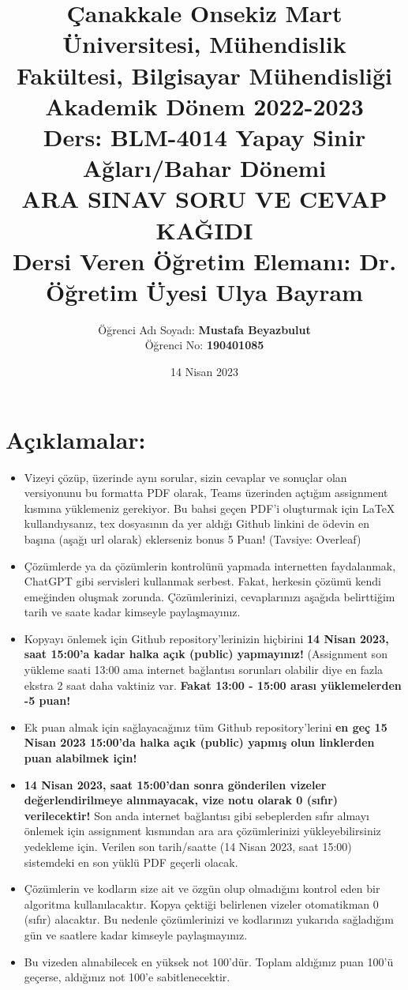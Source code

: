 \documentclass[11pt]{article}
\title{Çanakkale Onsekiz Mart Üniversitesi, Mühendislik Fakültesi, Bilgisayar Mühendisliği Akademik Dönem 2022-2023\\
Ders: BLM-4014 Yapay Sinir Ağları/Bahar Dönemi\\ 
ARA SINAV SORU VE CEVAP KAĞIDI\\
Dersi Veren Öğretim Elemanı: Dr. Öğretim Üyesi Ulya Bayram}
\author{%
\begin{minipage}{\textwidth}
\raggedright
Öğrenci Adı Soyadı:  \textbf{Mustafa Beyazbulut}\\ %
Öğrenci No:  \textbf{190401085}
\end{minipage}%
}
\date{14 Nisan 2023}
\begin{document}
\maketitle

\vspace{-.5in}
\section*{Açıklamalar:}
\begin{itemize}
    \item Vizeyi çözüp, üzerinde aynı sorular, sizin cevaplar ve sonuçlar olan versiyonunu bu formatta PDF olarak, Teams üzerinden açtığım assignment kısmına yüklemeniz gerekiyor. Bu bahsi geçen PDF'i oluşturmak için LaTeX kullandıysanız, tex dosyasının da yer aldığı Github linkini de ödevin en başına (aşağı url olarak) eklerseniz bonus 5 Puan! (Tavsiye: Overleaf)
    \item Çözümlerde ya da çözümlerin kontrolünü yapmada internetten faydalanmak, ChatGPT gibi servisleri kullanmak serbest. Fakat, herkesin çözümü kendi emeğinden oluşmak zorunda. Çözümlerinizi, cevaplarınızı aşağıda belirttiğim tarih ve saate kadar kimseyle paylaşmayınız. 
    \item Kopyayı önlemek için Github repository'lerinizin hiçbirini \textbf{14 Nisan 2023, saat 15:00'a kadar halka açık (public) yapmayınız!} (Assignment son yükleme saati 13:00 ama internet bağlantısı sorunları olabilir diye en fazla ekstra 2 saat daha vaktiniz var. \textbf{Fakat 13:00 - 15:00 arası yüklemelerden -5 puan!}
    \item Ek puan almak için sağlayacağınız tüm Github repository'lerini \textbf{en geç 15 Nisan 2023 15:00'da halka açık (public) yapmış olun linklerden puan alabilmek için!}
    \item \textbf{14 Nisan 2023, saat 15:00'dan sonra gönderilen vizeler değerlendirilmeye alınmayacak, vize notu olarak 0 (sıfır) verilecektir!} Son anda internet bağlantısı gibi sebeplerden sıfır almayı önlemek için assignment kısmından ara ara çözümlerinizi yükleyebilirsiniz yedekleme için. Verilen son tarih/saatte (14 Nisan 2023, saat 15:00) sistemdeki en son yüklü PDF geçerli olacak.
    \item Çözümlerin ve kodların size ait ve özgün olup olmadığını kontrol eden bir algoritma kullanılacaktır. Kopya çektiği belirlenen vizeler otomatikman 0 (sıfır) alacaktır. Bu nedenle çözümlerinizi ve kodlarınızı yukarıda sağladığım gün ve saatlere kadar kimseyle paylaşmayınız.
    \item Bu vizeden alınabilecek en yüksek not 100'dür. Toplam aldığınız puan 100'ü geçerse, aldığınız not 100'e sabitlenecektir.

\end{itemize}
\end{document}
